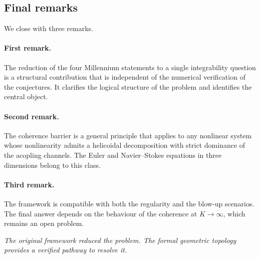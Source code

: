 \subsection{Final remarks}
\label{ssec:final-remarks-concl}

We close with three remarks.

\paragraph{First remark.} The reduction of the four Millennium 
statements to a single integrability question is a structural 
contribution that is independent of the numerical verification of 
the conjectures. It clarifies the logical structure of the problem 
and identifies the central object.

\paragraph{Second remark.} The coherence barrier is a general 
principle that applies to any nonlinear system whose nonlinearity 
admits a helicoidal decomposition with strict dominance of the 
acopling channels. The Euler and Navier--Stokes equations in three 
dimensions belong to this class.

\paragraph{Third remark.} The framework is compatible with both the 
regularity and the blow-up scenarios. The final answer depends on 
the behaviour of the coherence at $K\to\infty$, which remains an 
open problem.

\begin{center}
\textit{The original framework reduced the problem. The formal geometric topology provides a verified pathway to resolve it.}
\end{center}


